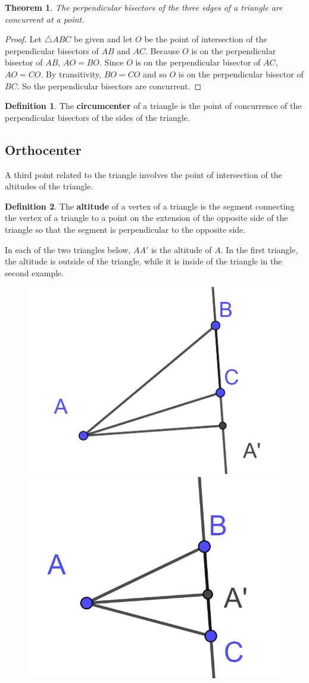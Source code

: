 \documentclass[
]{book}
\newtheorem{theorem}{Theorem}[chapter]
\theoremstyle{definition}
\newtheorem{definition}{Definition}[chapter]
\theoremstyle{definition}
\theoremstyle{definition}
\theoremstyle{definition}
\theoremstyle{remark}
\begin{document}
\begin{theorem}
The perpendicular bisectors of the three edges of a triangle are concurrent at a point.
\end{theorem}

\begin{proof}
Let \(\triangle ABC\) be given and let \(O\) be the point of intersection of the perpendicular bisectors of \(AB\) and \(AC\). Because \(O\) is on the perpendicular bisector of \(AB\), \(AO=BO\). Since \(O\) is on the perpendicular bisector of \(AC\), \(AO=CO\). By transitivity, \(BO=CO\) and so \(O\) is on the perpendicular bisector of \(BC\). So the perpendicular bisectors are concurrent.
\end{proof}

\begin{definition}
The \textbf{circumcenter} of a triangle is the point of concurrence of the perpendicular bisectors of the sides of the triangle.
\end{definition}

\hypertarget{orthocenter}{%
\subsection{Orthocenter}\label{orthocenter}}

A third point related to the triangle involves the point of intersection of the altitudes of the triangle.

\begin{definition}
The \textbf{altitude} of a vertex of a triangle is the segment connecting the vertex of a triangle to a point on the extension of the opposite side of the triangle so that the segment is perpendicular to the opposite side.
\end{definition}

In each of the two triangles below, \(AA'\) is the altitude of \(A\). In the first triangle, the altitude is outside of the triangle, while it is inside of the triangle in the second example.

\begin{figure}

{\centering \includegraphics[width=0.2\linewidth]{images/orthocenter1} \includegraphics[width=0.2\linewidth]{images/orthocenter2} 

}

\end{figure}
\end{document}
